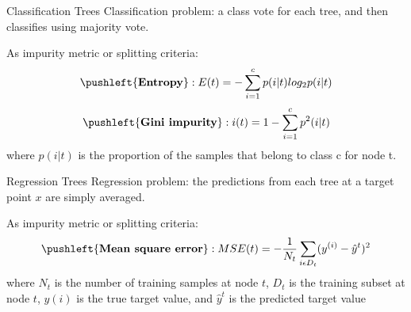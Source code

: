 \documentclass[notes]{beamer}          %
\begin{document}
\begin{frame}{Classification Trees}
Classification problem: a class vote for each tree, and then classifies using majority vote. \newline

As impurity metric or splitting criteria: 
\begin{equation*}
\pushleft{\textbf{Entropy}}: E(t) = - \sum_{i=1}^{c} p(i|t) log_2 p(i|t)
\end{equation*}
\begin{equation*}
\pushleft{\textbf{Gini impurity}}: i(t) = 1 - \sum_{i=1}^{c} p^2(i|t) 
\end{equation*}
where $p(i|t)$ is the proportion of the samples that belong to class c for node t. 

\end{frame}
\begin{frame}{Regression Trees}
Regression problem: the predictions from each tree at a target point $x$ are simply averaged. \newline

As impurity metric or splitting criteria: 
\begin{equation*}
\pushleft{\textbf{Mean square error}}: MSE(t) = - \frac{1}{N_t} \sum_{i \epsilon D_t} (y^{(i)} - \hat{y}^t)^2
\end{equation*}
where $N_t$ is the number of training samples at node $t$, $D_t$ is the training subset at node $t$, $y(i)$ is the true target value, and $\hat{y}^t$ is the predicted target value
\end{frame}
\end{document}
